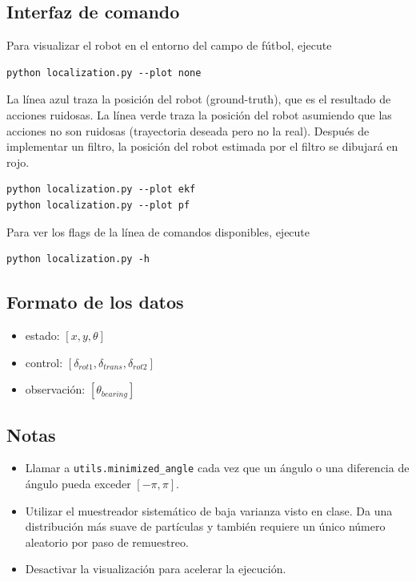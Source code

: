 \documentclass[tp]{lcc}
\begin{document}
	\subsection{Interfaz de comando}

	Para visualizar el robot en el entorno del campo de fútbol, ejecute

\begin{lstlisting}[style=bash] 
python localization.py --plot none
\end{lstlisting}


	La línea {\color{blue} azul} traza la posición del robot (ground-truth), que es el resultado de acciones ruidosas. La línea {\color{green} verde} traza la posición del robot asumiendo que las acciones no son ruidosas (trayectoria deseada pero no la real). Después de implementar un filtro, la posición del robot estimada por el filtro se dibujará en {\color{red} rojo}.
	
	
\begin{lstlisting}[style=bash] 
python localization.py --plot ekf
python localization.py --plot pf
\end{lstlisting}

	Para ver los flags de la línea de comandos disponibles, ejecute

\begin{lstlisting}[style=bash] 
python localization.py -h
\end{lstlisting}

	\subsection{Formato de los datos}

	\begin{itemize}
		\item estado: $[x,y,\theta]$
		\item control: $[\delta_{rot1},\delta_{trans},\delta_{rot2}]$
		\item observación: $[\theta_{bearing}]$
	\end{itemize}
	
	\subsection{Notas}
	\begin{itemize}
		\item Llamar a \lstinline[style=bash]{utils.minimized_angle} cada vez que un ángulo o una diferencia de ángulo pueda exceder $[-\pi, \pi]$.
		\item Utilizar el muestreador sistemático de baja varianza visto en clase. Da una distribución más suave de partículas y también requiere un único número aleatorio por paso de remuestreo.
		\item Desactivar la visualización para acelerar la ejecución.
	\end{itemize}
\end{document}
